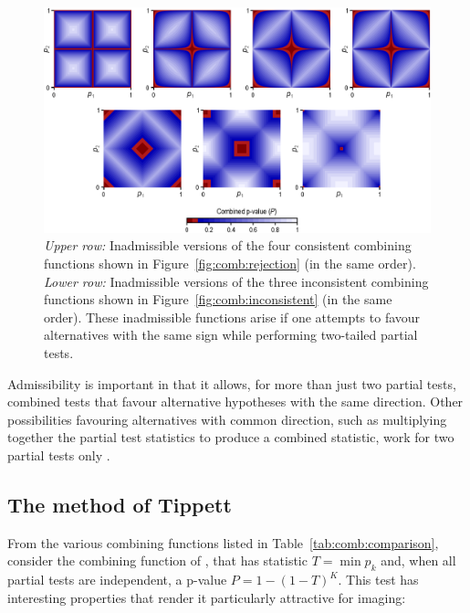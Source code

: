 \begin{figure}[!p]
\begin{center}
\centerline{\includegraphics[scale=.8]{images/inadmissible.eps}}
\end{center}
\caption[Examples of inadmissible combining functions.]{\emph{Upper row:} Inadmissible versions of the four consistent combining functions shown in Figure~\ref{fig:comb:rejection} (in the same order). \emph{Lower row:} Inadmissible versions of the three inconsistent combining functions shown in Figure~\ref{fig:comb:inconsistent} (in the same order). These inadmissible functions arise if one attempts to favour alternatives with the same sign while performing two-tailed partial tests.}
\label{fig:comb:inadmissible}
\end{figure}

Admissibility is important in that it allows, for more than just two partial tests, combined tests that favour alternative hypotheses with the same direction. Other possibilities favouring alternatives with common direction, such as multiplying together the partial test statistics to produce a combined statistic, work for two partial tests only \citep{Hayasaka2006}.

\subsection{The method of Tippett}

From the various combining functions listed in Table~\ref{tab:comb:comparison}, consider the combining function of \citet{Tippett1931}, that has statistic $T = \min {p_{k}}$ and, when all partial tests are independent, a p-value $P = 1-(1-T)^K$. This test has interesting properties that render it particularly attractive for imaging:

